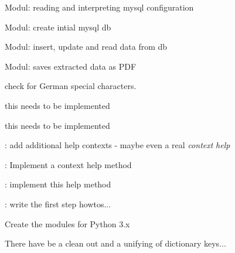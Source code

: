 
\begin{DoxyRefList}
\item[\label{todo__todo000001}%
\hypertarget{todo__todo000001}{}%
File \hyperlink{Backpack_8py}{Backpack.py} ]Modul\-: reading and interpreting mysql configuration 

Modul\-: create intial mysql db 

Modul\-: insert, update and read data from db 

Modul\-: saves extracted data as P\-D\-F  
\item[\label{todo__todo000035}%
\hypertarget{todo__todo000035}{}%
File \hyperlink{lang_8py}{lang.py} ]check for German special characters.  
\item[\label{todo__todo000018}%
\hypertarget{todo__todo000018}{}%
Global \hyperlink{classgui_1_1window3a_1_1MainWindow_a784d15d1157ea5b181c63d73daa3fc5e}{Main\-Window.help\-Handbook} ]this needs to be implemented  
\item[\label{todo__todo000002}%
\hypertarget{todo__todo000002}{}%
Global \hyperlink{classgui_1_1window2_1_1MainWindow_a784d15d1157ea5b181c63d73daa3fc5e}{Main\-Window.help\-Handbook} ]this needs to be implemented  
\item[\label{todo__todo000015}%
\hypertarget{todo__todo000015}{}%
Global \hyperlink{classgui_1_1window3_1_1MenuWin_ab66f1da42371ac6f08a9817adf59a38e}{Menu\-Win.add\-Help} ]\-: add additional help contexts -\/ maybe even a real {\itshape context} {\itshape help}  
\item[\label{todo__todo000017}%
\hypertarget{todo__todo000017}{}%
Global \hyperlink{classgui_1_1window3_1_1MenuWin_a4b810e6adc7d147eaa8edb45dd5891ca}{Menu\-Win.context\-Help} ]\-: Implement a context help method  
\item[\label{todo__todo000016}%
\hypertarget{todo__todo000016}{}%
Global \hyperlink{classgui_1_1window3_1_1MenuWin_a2e91f76cce6e9b7a03830202f45aecf0}{Menu\-Win.first\-Steps} ]\-: implement this help method 

\-: write the first step howtos...  
\item[\label{todo__todo000034}%
\hypertarget{todo__todo000034}{}%
Namespace \hyperlink{namespacetoolbox}{toolbox} ]Create the modules for Python 3.\-x  
\item[\label{todo__todo000036}%
\hypertarget{todo__todo000036}{}%
File \hyperlink{xmlbox_8py}{xmlbox.py} ]There have be a clean out and a unifying of dictionary keys... 
\end{DoxyRefList}